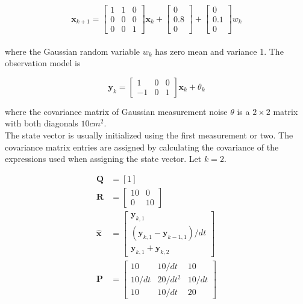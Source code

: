 \documentclass[10pt,conference,compsoc]{IEEEtran}
\newcommand{\mtx}[1] {\bm #1}
\begin{document}
\begin{equation}
  \mtx{x}_{k+1} = \left[
  \begin{array}{ccc}
    1 & 1 & 0 \\
    0 & 0 & 0 \\
    0 & 0 & 1
  \end{array} \right] \mtx{x}_k + \left[
  \begin{array}{c}
    0 \\
    0.8 \\
    0
  \end{array} \right] + \left[
  \begin{array}{c}
    0 \\
    0.1 \\
    0
  \end{array} \right] w_k
\end{equation}
\\
where the Gaussian random variable $w_k$ has zero mean and variance 1. The
observation model is

\begin{equation}
  \mtx{y}_k = \left[
  \begin{array}{ccc}
    1 & 0 & 0 \\
    -1 & 0 & 1
  \end{array} \right] \mtx{x}_k + \theta_k
\end{equation}

where the covariance matrix of Gaussian measurement noise $\theta$ is a
$2 \times 2$ matrix with both diagonals $10 cm^2$. \\

The state vector is usually initialized using the first measurement or two. The
covariance matrix entries are assigned by calculating the covariance of the
expressions used when assigning the state vector. Let $k = 2$.

\begin{align}
  \mtx{Q} &= \left[1\right] \\
  \mtx{R} &= \left[
  \begin{array}{cc}
    10 & 0 \\
    0 & 10
  \end{array} \right] \\
  \hat{\mtx{x}} &= \left[
  \begin{array}{c}
    \mtx{y}_{k,1} \\
    (\mtx{y}_{k,1} - \mtx{y}_{k-1,1})/dt \\
    \mtx{y}_{k,1} + \mtx{y}_{k,2}
  \end{array} \right] \\
  \mtx{P} &= \left[
  \begin{array}{ccc}
    10 & 10/dt & 10 \\
    10/dt & 20/dt^2 & 10/dt \\
    10 & 10/dt & 20
  \end{array} \right]
\end{align}
\end{document}
